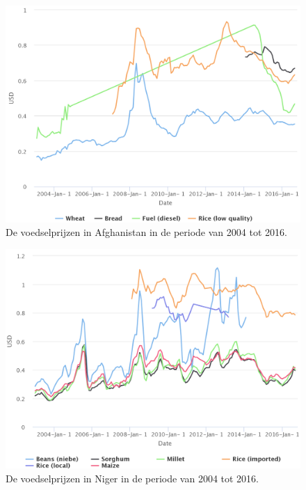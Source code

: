 \documentclass{article}
\begin{document}
\begin{figure}[h!]
        
        \centering
        \includegraphics[scale=0.25]{images/mortality_product_afghanistan.png}
        \caption{De voedselprijzen in Afghanistan in de periode van 2004 tot 2016.}
        \medskip
        \small
        \label{mortality_afghanistan}
        \end{figure}



 \begin{figure}[h!]
        \centering
        \includegraphics[scale=0.27]{images/mortality_product_niger.png}
        \caption{De voedselprijzen in Niger in de periode van 2004 tot 2016.}
        \label{mortality_niger}
        \medskip
        \small
        \end{figure}
\end{document}
